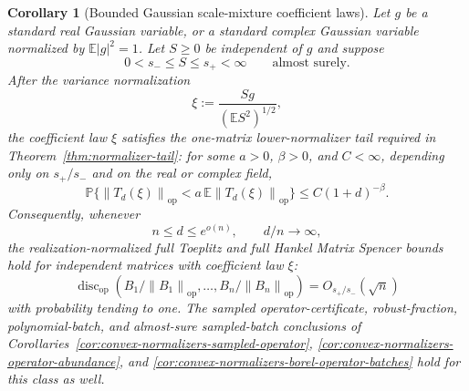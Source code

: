 \documentclass[11pt]{amsart}
\numberwithin{equation}{section}
\newtheorem{corollary}[theorem]{Corollary}
\theoremstyle{definition}
\theoremstyle{remark}
\newcommand{\op}{\mathrm{op}}
\newcommand{\discop}{\operatorname{disc}_{\op}}
\newcommand{\Prob}{\mathbb P}
\newcommand{\Exp}{\mathbb E}
\newcommand{\norm}[1]{\left\lVert #1\right\rVert}
\begin{document}
\begin{corollary}[Bounded Gaussian scale-mixture coefficient laws]
\label{cor:bounded-gaussian-scale-mixture-normalizers}
Let \(g\) be a standard real Gaussian variable, or a standard complex Gaussian
variable normalized by \(\Exp|g|^2=1\).  Let \(S\ge0\) be independent of \(g\)
and suppose
\[
  0<s_-\le S\le s_+<\infty
  \qquad\text{almost surely}.
\]
After the variance normalization
\[
  \xi:=\frac{Sg}{(\Exp S^2)^{1/2}},
\]
the coefficient law \(\xi\) satisfies the one-matrix lower-normalizer tail
required in Theorem~\ref{thm:normalizer-tail}: for some \(a>0\), \(\beta>0\),
and \(C<\infty\), depending only on \(s_+/s_-\) and on the real or complex
field,
\[
  \Prob\{\norm{T_d(\xi)}_{\op}<a\,\Exp\norm{T_d(\xi)}_{\op}\}
  \le C(1+d)^{-\beta}.
\]
Consequently, whenever
\[
  n\le d\le e^{o(n)},\qquad d/n\to\infty,
\]
the realization-normalized full Toeplitz and full Hankel Matrix Spencer bounds
hold for independent matrices with coefficient law \(\xi\):
\[
  \discop(B_1/\norm{B_1}_{\op},\ldots,B_n/\norm{B_n}_{\op})
  =O_{s_+/s_-}(\sqrt n)
\]
with probability tending to one.  The sampled operator-certificate,
robust-fraction, polynomial-batch, and almost-sure sampled-batch conclusions of
Corollaries~\ref{cor:convex-normalizers-sampled-operator},
\ref{cor:convex-normalizers-operator-abundance}, and
\ref{cor:convex-normalizers-borel-operator-batches} hold for this class as
well.
\end{corollary}
\end{document}
